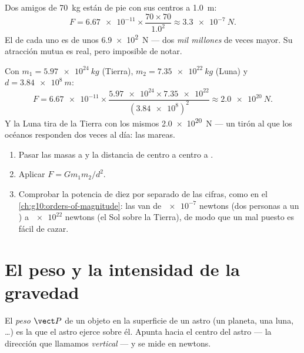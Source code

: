 \begin{example}\label{ex:g10:universal-gravitation:friends}
Dos amigos de \qty{70}{kg} están de pie con sus centros a \qty{1.0}{m}:
\[
F = \num{6.67e-11} \times \frac{70 \times 70}{1.0^2}
\approx \qty{3.3e-7}{N}.
\]
El  de cada uno es de unos \qty{6.9e2}{N} --- dos \emph{mil
millones} de veces mayor. Su atracción mutua es real, pero imposible de
notar.
\end{example}

\begin{example}\label{ex:g10:universal-gravitation:earthmoon}
Con $m_1 = \qty{5.97e24}{kg}$ (Tierra), $m_2 = \qty{7.35e22}{kg}$ (Luna)
y $d = \qty{3.84e8}{m}$:
\[
F = \num{6.67e-11} \times
\frac{\num{5.97e24} \times \num{7.35e22}}{(\num{3.84e8})^2}
\approx \qty{2.0e20}{N}.
\]
Y la Luna tira de la Tierra con los mismos \qty{2.0e20}{N} --- un tirón
al que los océanos responden dos veces al día: las mareas.
\end{example}

\begin{method}\label{met:g10:universal-gravitation:compute}
\begin{enumerate}
  \item Pasar las masas a  y la distancia de centro a centro a
        .
  \item Aplicar $F = G m_1 m_2 / d^2$.
  \item Comprobar la potencia de diez por separado de las cifras, como
        en el \cref{ch:g10:orders-of-magnitude}: las  van de $\num{e-7}$ newtons (dos personas a un
        ) a $\num{e22}$ newtons (el Sol sobre la Tierra), de modo
        que un  mal puesto es fácil de cazar.
\end{enumerate}
\end{method}

\section{El peso y la intensidad de la gravedad}

\begin{definition}[Peso]\label{def:g10:universal-gravitation:weight}
El \emph{peso} $\vect P$ de un objeto en la superficie de un
astro (un planeta, una luna, \dots) es la  que el
astro ejerce sobre él. Apunta hacia el centro del astro --- la dirección
que llamamos \emph{vertical} --- y se mide en newtons.
\end{definition}

